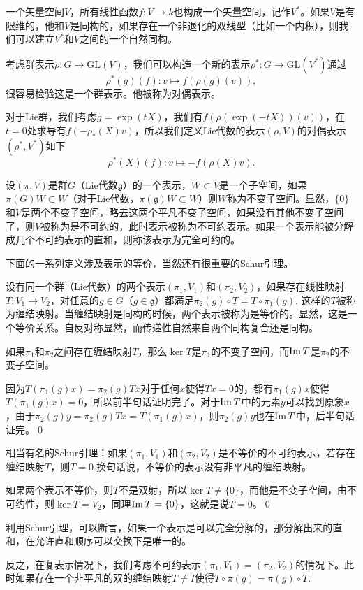 \documentclass[9pt]{extarticle}
\newcommand{\lag}{{\mathfrak{g}}}
\begin{document}
\para 一个矢量空间$V$，所有线性函数$f:V\to k$也构成一个矢量空间，记作$V^*$。如果$V$是有限维的，他和$V$是同构的，如果存在一个非退化的双线型（比如一个内积），则我们可以建立$V^*$和$V$之间的一个自然同构。

考虑群表示$\rho:G\to \mathrm{GL}(V)$，我们可以构造一个新的表示$\rho^*:G\to \mathrm{GL}(V^*)$通过
\[
	\rho^*(g)(f):v\mapsto f(\rho(g)(v)),
\]
很容易检验这是一个群表示。他被称为对偶表示。

对于Lie群，我们考虑$g=\exp(tX)$，我们有$f(\rho(\exp(-tX))(v))$，在$t=0$处求导有$f(-\rho_*(X)v)$，所以我们定义Lie代数的表示$(\rho,V)$的对偶表示$(\rho^*,V^*)$如下
\[
	\rho^*(X)(f):v\mapsto -f(\rho(X)v).
\]

\para 设$(\pi,V)$是群$G$（Lie代数$\lag$）的一个表示，$W\subset V$是一个子空间，如果$\pi(G)W\subset W$（对于Lie代数，$\pi(\lag)W\subset W$）则$W$称为不变子空间。显然，$\{0\}$和$V$是两个不变子空间，略去这两个平凡不变子空间，如果没有其他不变子空间了，则$V$被称为是不可约的，此时表示被称为不可约表示。如果一个表示能被分解成几个不可约表示的直和，则称该表示为完全可约的。

下面的一系列定义涉及表示的等价，当然还有很重要的Schur引理。

\para 设有同一个群（Lie代数）的两个表示$(\pi_1,V_1)$和$(\pi_2,V_2)$，如果存在线性映射$T:V_1\to V_2$，对任意的$g\in G$（$g\in \lag$）都满足$\pi_2(g)\circ T=T\circ \pi_1(g)$. 这样的$T$被称为缠结映射。当缠结映射是同构的时候，两个表示被称为是等价的。显然，这是一个等价关系。自反对称显然，而传递性自然来自两个同构复合还是同构。

\lem 如果$\pi_1$和$\pi_2$之间存在缠结映射$T$，那么$\ker T$是$\pi_1$的不变子空间，而$\operatorname{Im} T$是$\pi_2$的不变子空间。

\proof 因为$T(\pi_1(g)x)=\pi_2(g)Tx$对于任何$x$使得$Tx=0$的，都有$\pi_1(g)x$使得$T(\pi_1(g)x)=0$，所以前半句话证明完了。对于$\operatorname{Im} T$中的元素$y$可以找到原象$x$，由于$\pi_2(g)y=\pi_2(g)Tx=T(\pi_1(g)x)$，则$\pi_2(g)y$也在$\operatorname{Im} T$中，后半句话证完。\qed

\lem 相当有名的Schur引理：如果$(\pi_1,V_1)$和$(\pi_2,V_2)$是不等价的不可约表示，若存在缠结映射$T$，则$T=0$.换句话说，不等价的表示没有非平凡的缠结映射。

\proof 如果两个表示不等价，则$T$不是双射，所以$\ker T\neq \{0\}$，而他是不变子空间，由不可约性，则$\ker T= V_2$，同理$\operatorname{Im}  T= \{0\}$，这就是说$T=0$。\qed

利用Schur引理，可以断言，如果一个表示是可以完全分解的，那分解出来的直和，在允许直和顺序可以交换下是唯一的。

\para 反之，在复表示情况下，我们考虑不可约表示$(\pi_1,V_1)=(\pi_2,V_2)$的情况下。此时如果存在一个非平凡的双的缠结映射$T\neq I$使得$T\circ \pi(g)=\pi(g)\circ T$.
\end{document}
